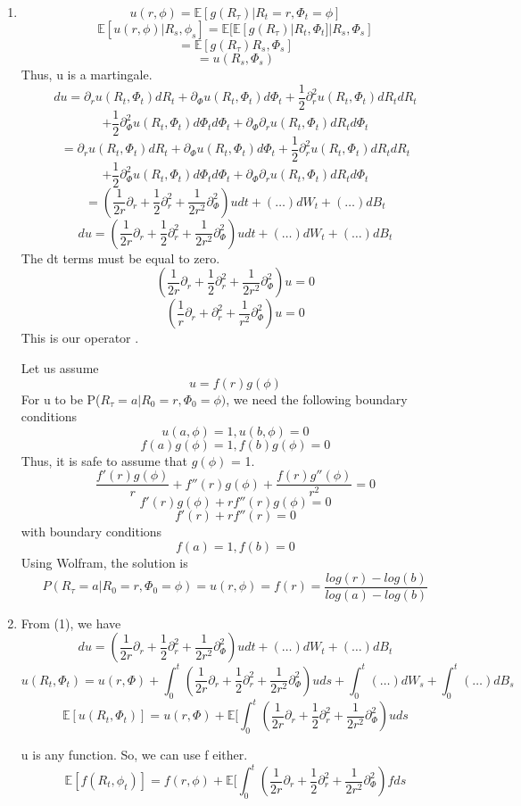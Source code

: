 \documentclass[a4paper,11pt]{article}
\begin{document}
\begin{enumerate}
\begin{enumerate}
\item 
\[u(r,\phi) = \mathbb{E}[g(R_\tau)|R_t=r , \Phi_t = \phi]\]
\[\mathbb{E}[u(r,\phi)|R_s ,\phi_s] = \mathbb{E}[\mathbb{E}[g(R_\tau)|R_t, \Phi_t ]|R_s ,\Phi_s]\]
\[= \mathbb{E}[g(R_\tau)R_s ,\Phi_s]\]
\[= u(R_s ,\Phi_s)\]
Thus, u is a martingale.
\[d u  = \partial_r u(R_t,\Phi_t) dR_t  + \partial_\Phi u(R_t,\Phi_t) d\Phi_t + \frac{1}{2} \partial^2_r u(R_t,\Phi_t) dR_t d R_t  \]\[+ \frac{1}{2} \partial^2_\Phi u(R_t,\Phi_t) d\Phi_t d \Phi_t +  \partial_\Phi\partial_r u(R_t,\Phi_t) dR_t d \Phi_t\]
\[= \partial_r u(R_t,\Phi_t) dR_t  + \partial_\Phi u(R_t,\Phi_t) d\Phi_t + \frac{1}{2} \partial^2_r u(R_t,\Phi_t) dR_t d R_t  \]\[+ \frac{1}{2} \partial^2_\Phi u(R_t,\Phi_t) d\Phi_t d \Phi_t +  \partial_\Phi\partial_r u(R_t,\Phi_t) dR_t d \Phi_t\]
\[= (\frac{1}{2r}\partial_r+\frac{1}{2}\partial^2_r+\frac{1}{2r^2}\partial^2_\Phi)u dt + (\ldots)dW_t + (\ldots)dB_t\]
\begin{equation}
du = (\frac{1}{2r}\partial_r+\frac{1}{2}\partial^2_r+\frac{1}{2r^2}\partial^2_\Phi)u dt + (\ldots)dW_t + (\ldots)dB_t
\end{equation}
The dt terms must be equal to zero.
\[ (\frac{1}{2r}\partial_r+\frac{1}{2}\partial^2_r+\frac{1}{2r^2}\partial^2_\Phi)u =0\]
\[ (\frac{1}{r}\partial_r+\partial^2_r+\frac{1}{r^2}\partial^2_\Phi)u =0\]
This is our operator .

Let us assume 
\[u = f(r)g(\phi)\]
For u to be P($R_\tau = a|R_0=r,\Phi_0=\phi) $, we need the following boundary conditions 
\[u(a,\phi) = 1, u(b,\phi) = 0 \]
\[f(a)g(\phi) = 1, f(b)g(\phi) = 0 \]
Thus, it is safe to assume that $g(\phi)$ = 1.
\[\frac{f'(r)g(\phi)}{r}+ f''(r)g(\phi)+\frac{f(r)g''(\phi)}{r^2}  = 0\]
\[f'(r)g(\phi)+ rf''(r)g(\phi)  = 0\]
\[f'(r)+ rf''(r)  = 0\]
with boundary conditions
\[f(a)=1 , f(b) = 0\]
Using Wolfram, the solution is 
\[ \boxed{P(R_\tau = a|R_0=r,\Phi_0=\phi) = u(r, \phi) = f(r) = \frac{log(r) - log(b)}{log(a) - log(b)} }\]
\item 
From (1), we have
\[du = (\frac{1}{2r}\partial_r+\frac{1}{2}\partial^2_r+\frac{1}{2r^2}\partial^2_\Phi)u dt + (\ldots)dW_t + (\ldots)dB_t\]
\[u(R_t,\Phi_t) =  u(r,\Phi)+\int_0^t (\frac{1}{2r}\partial_r+\frac{1}{2}\partial^2_r+\frac{1}{2r^2}\partial^2_\Phi)u ds + \int_0^t (\ldots)dW_s +  \int_0^t (\ldots)dB_s\]
\[\mathbb{E}[u(R_t,\Phi_t)] =  u(r,\Phi) + \mathbb{E}[\int_0^t (\frac{1}{2r}\partial_r+\frac{1}{2}\partial^2_r+\frac{1}{2r^2}\partial^2_\Phi)u ds\]

u is any function. So, we can use f either.
\[\mathbb{E}[f(R_t,\phi_t)] =  f(r,\phi) + \mathbb{E}[\int_0^t (\frac{1}{2r}\partial_r+\frac{1}{2}\partial^2_r+\frac{1}{2r^2}\partial^2_\Phi)f ds\]


\end{enumerate}
\end{enumerate}
\end{document}
